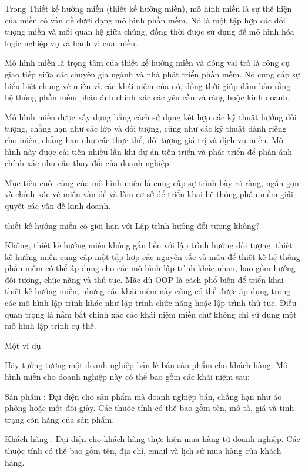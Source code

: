 Trong Thiết kế hướng miền (thiết kế hướng miền), mô hình miền là sự thể hiện của miền có vấn đề dưới dạng mô hình phần mềm. Nó là một tập hợp các đối tượng miền và mối quan hệ giữa chúng, đồng thời được sử dụng để mô hình hóa logic nghiệp vụ và hành vi của miền.

Mô hình miền là trọng tâm của thiết kế hướng miền và đóng vai trò là công cụ giao tiếp giữa các chuyên gia ngành và nhà phát triển phần mềm. Nó cung cấp sự hiểu biết chung về miền và các khái niệm của nó, đồng thời giúp đảm bảo rằng hệ thống phần mềm phản ánh chính xác các yêu cầu và ràng buộc kinh doanh.

Mô hình miền được xây dựng bằng cách sử dụng kết hợp các kỹ thuật hướng đối tượng, chẳng hạn như các lớp và đối tượng, cũng như các kỹ thuật dành riêng cho miền, chẳng hạn như các thực thể, đối tượng giá trị và dịch vụ miền. Mô hình này được cải tiến nhiều lần khi dự án tiến triển và phát triển để phản ánh chính xác nhu cầu thay đổi của doanh nghiệp.

Mục tiêu cuối cùng của mô hình miền là cung cấp sự trình bày rõ ràng, ngắn gọn và chính xác về miền vấn đề và làm cơ sở để triển khai hệ thống phần mềm giải quyết các vấn đề kinh doanh.

thiết kế hướng miền có giới hạn với Lập trình hướng đối tượng không?

Không, thiết kế hướng miền không gắn liền với lập trình hướng đối tượng. thiết kế hướng miền cung cấp một tập hợp các nguyên tắc và mẫu để thiết kế hệ thống phần mềm có thể áp dụng cho các mô hình lập trình khác nhau, bao gồm hướng đối tượng, chức năng và thủ tục. Mặc dù OOP là cách phổ biến để triển khai thiết kế hướng miền, nhưng các khái niệm này cũng có thể được áp dụng trong các mô hình lập trình khác như lập trình chức năng hoặc lập trình thủ tục. Điều quan trọng là nắm bắt chính xác các khái niệm miền chứ không chỉ sử dụng một mô hình lập trình cụ thể.

Một ví dụ

Hãy tưởng tượng một doanh nghiệp bán lẻ bán sản phẩm cho khách hàng. Mô hình miền cho doanh nghiệp này có thể bao gồm các khái niệm sau:

Sản phẩm : Đại diện cho sản phẩm mà doanh nghiệp bán, chẳng hạn như áo phông hoặc một đôi giày. Các thuộc tính có thể bao gồm tên, mô tả, giá và tình trạng còn hàng của sản phẩm.

Khách hàng : Đại diện cho khách hàng thực hiện mua hàng từ doanh nghiệp. Các thuộc tính có thể bao gồm tên, địa chỉ, email và lịch sử mua hàng của khách hàng.


